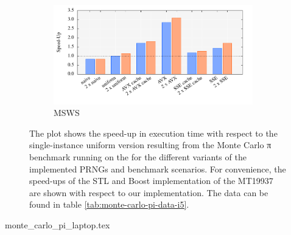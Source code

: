 \documentclass{stdlocal}
\begin{document}
\begin{figure}[H]
    \begin{subfigure}[b]{\textwidth}
      \center
      \includegraphics[width=0.95\textwidth]{plots/monte_carlo_pi_laptop_msws.pdf}
      \caption{MSWS}
    \end{subfigure}
    \caption[Monte Carlo π Benchmark Speed-Up for ]{%
      The plot shows the speed-up in execution time with respect to the single-instance uniform version resulting from the Monte Carlo π benchmark running on the  for the different variants of the implemented PRNGs and benchmark scenarios.
      For convenience, the speed-ups of the STL and Boost implementation of the MT19937 are shown with respect to our implementation.
      The data can be found in table \ref{tab:monte-carlo-pi-data-i5}.
    }
  \end{figure}

  \begin{table}[H]
    \center
    \caption[Monte Carlo π Benchmark Data for ]{%
      The table shows the results achieved by running the Monte Carlo π Benchmark on the  with all implemented variants of given PRNGs and benchmark scenarios.
      While running the benchmark, $10^{8}$ samples in the unit square were used to estimate the value of π.
      It was ensured that the estimation error was small enough according to the calculation at the end of section \ref{sub:monte_carlo_integration}.
      During the execution, there were no cache or branch misses.
      The values for cycles, instructions, and IPCs were averaged over the number of samples in the unit square.
    }
    \label{tab:monte-carlo-pi-data-i5}
    \footnotesize
    \renewcommand{\arraystretch}{1.2}
    {monte_carlo_pi_laptop.tex}
  \end{table}
\end{document}
